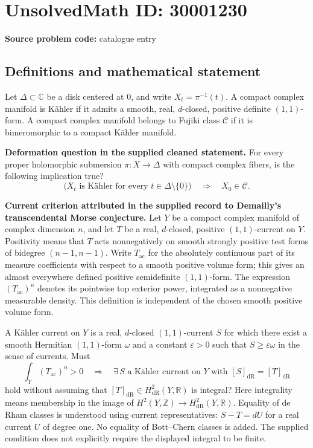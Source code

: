 \documentclass[11pt]{article}
\newcommand{\Z}{\mathbb{Z}}
\newcommand{\R}{\mathbb{R}}
\newcommand{\C}{\mathbb{C}}
\begin{document}
\section*{UnsolvedMath ID: 30001230}
\textbf{Source problem code:} catalogue entry
\subsection{Definitions and mathematical statement}
Let \(\Delta\subset\C\) be a disk centered at \(0\), and write \(X_t=\pi^{-1}(t)\). A compact complex manifold is Kähler if it admits a smooth, real, \(d\)-closed, positive definite \((1,1)\)-form. A compact complex manifold belongs to Fujiki class \(\mathcal C\) if it is bimeromorphic to a compact Kähler manifold.

\textbf{Deformation question in the supplied cleaned statement.} For every proper holomorphic submersion \(\pi:X\to\Delta\) with compact complex fibers, is the following implication true?
\[
\bigl( X_t\text{ is Kähler for every }t\in\Delta\setminus\{0\}\bigr)
\quad\Longrightarrow\quad X_0\in\mathcal C.
\]

\textbf{Current criterion attributed in the supplied record to Demailly's transcendental Morse conjecture.} Let \(Y\) be a compact complex manifold of complex dimension \(n\), and let \(T\) be a real, \(d\)-closed, positive \((1,1)\)-current on \(Y\). Positivity means that \(T\) acts nonnegatively on smooth strongly positive test forms of bidegree \((n-1,n-1)\). Write \(T_{\mathrm{ac}}\) for the absolutely continuous part of its measure coefficients with respect to a smooth positive volume form; this gives an almost everywhere defined positive semidefinite \((1,1)\)-form. The expression \((T_{\mathrm{ac}})^n\) denotes its pointwise top exterior power, integrated as a nonnegative measurable density. This definition is independent of the chosen smooth positive volume form.

A Kähler current on \(Y\) is a real, \(d\)-closed \((1,1)\)-current \(S\) for which there exist a smooth Hermitian \((1,1)\)-form \(\omega\) and a constant \(\varepsilon>0\) such that \(S\geq\varepsilon\omega\) in the sense of currents. Must
\[
\int_Y (T_{\mathrm{ac}})^n>0
\quad\Longrightarrow\quad
\exists\,S\text{ a Kähler current on }Y
\text{ with }[S]_{\mathrm{dR}}=[T]_{\mathrm{dR}}
\]
hold without assuming that \([T]_{\mathrm{dR}}\in H^2_{\mathrm{dR}}(Y,\R)\) is integral? Here integrality means membership in the image of \(H^2(Y,\Z)\to H^2_{\mathrm{dR}}(Y,\R)\). Equality of de Rham classes is understood using current representatives: \(S-T=dU\) for a real current \(U\) of degree one. No equality of Bott--Chern classes is added. The supplied condition does not explicitly require the displayed integral to be finite.
\end{document}
